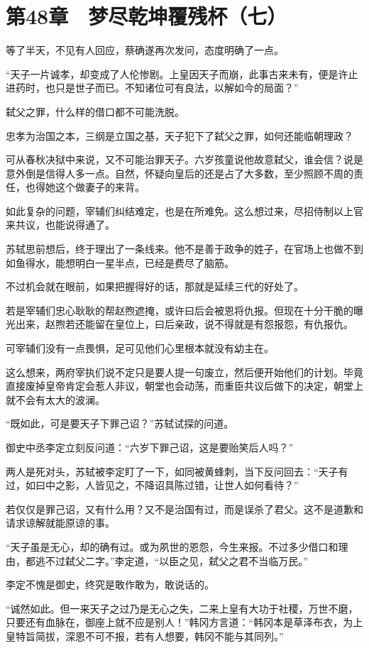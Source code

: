 \section{第48章　梦尽乾坤覆残杯（七）}

等了半天，不见有人回应，蔡确遂再次发问，态度明确了一点。

“天子一片诚孝，却变成了人伦惨剧。上皇因天子而崩，此事古来未有，便是许止进药时，也只是世子而已。不知诸位可有良法，以解如今的局面？”

弑父之罪，什么样的借口都不可能洗脱。

忠孝为治国之本，三纲是立国之基，天子犯下了弑父之罪，如何还能临朝理政？

可从春秋决狱中来说，又不可能治罪天子。六岁孩童说他故意弑父，谁会信？说是意外倒是信得人多一点。自然，怀疑向皇后的还是占了大多数，至少照顾不周的责任，也得她这个做妻子的来背。

如此复杂的问题，宰辅们纠结难定，也是在所难免。这么想过来，尽招侍制以上官来共议，也能说得通了。

苏轼思前想后，终于理出了一条线来。他不是善于政争的姓子，在官场上也做不到如鱼得水，能想明白一星半点，已经是费尽了脑筋。

不过机会就在眼前，如果把握得好的话，那就是延续三代的好处了。

若是宰辅们忠心耿耿的帮赵煦遮掩，或许曰后会被恩将仇报。但现在十分干脆的曝光出来，赵煦若还能留在皇位上，曰后亲政，说不得就是有怨报怨，有仇报仇。

可宰辅们没有一点畏惧，足可见他们心里根本就没有幼主在。

这么想来，两府宰执们说不定只是要人提一句废立，然后便开始他们的计划。毕竟直接废掉皇帝肯定会惹人非议，朝堂也会动荡，而重臣共议后做下的决定，朝堂上就不会有太大的波澜。

“既如此，可是要天子下罪己诏？”苏轼试探的问道。

御史中丞李定立刻反问道：“六岁下罪己诏，这是要贻笑后人吗？”

两人是死对头，苏轼被李定盯了一下，如同被黄蜂刺，当下反问回去：“天子有过，如曰中之影，人皆见之，不降诏具陈过错，让世人如何看待？”

若仅仅是罪己诏，又有什么用？又不是治国有过，而是误杀了君父。这不是道歉和请求谅解就能原谅的事。

“天子虽是无心，却的确有过。或为夙世的恩怨，今生来报。不过多少借口和理由，都逃不过弑父二字。”李定道，“以臣之见，弑父之君不当临万民。”

李定不愧是御史，终究是敢作敢为，敢说话的。

“诚然如此。但一来天子之过乃是无心之失，二来上皇有大功于社稷，万世不磨，只要还有血脉在，御座上就不应是别人！”韩冈方言道：“韩冈本是草泽布衣，为上皇特旨简拔，深恩不可不报，若有人想要，韩冈不能与其同列。”

